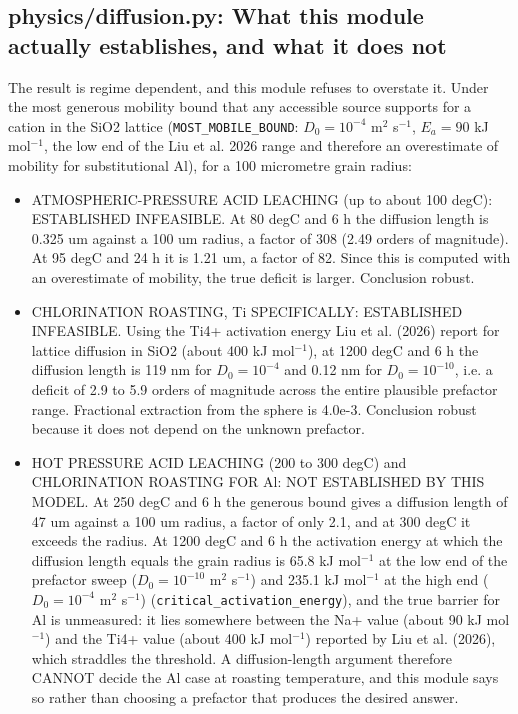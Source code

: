 \documentclass[10pt,a4paper,twoside]{report}
\begin{document}
\subsection{physics/diffusion.py: What this module actually establishes, and what it does not}

The result is regime dependent, and this module refuses to overstate it. Under the most generous mobility bound that any accessible source supports for a cation in the SiO2 lattice (\texttt{MOST\_MOBILE\_BOUND}: $D_0 = 10^{-4}$ m$^{2}$ s$^{-1}$, $E_a = 90$ kJ mol$^{-1}$, the low end of the Liu et al. 2026 range and therefore an overestimate of mobility for substitutional Al), for a 100 micrometre grain radius:

\begin{itemize}
\item ATMOSPHERIC-PRESSURE ACID LEACHING (up to about 100 degC): ESTABLISHED INFEASIBLE. At 80 degC and 6 h the diffusion length is 0.325 um against a 100 um radius, a factor of 308 (2.49 orders of magnitude). At 95 degC and 24 h it is 1.21 um, a factor of 82. Since this is computed with an overestimate of mobility, the true deficit is larger. Conclusion robust.
\item CHLORINATION ROASTING, Ti SPECIFICALLY: ESTABLISHED INFEASIBLE. Using the Ti4+ activation energy Liu et al. (2026) report for lattice diffusion in SiO2 (about 400 kJ mol$^{-1}$), at 1200 degC and 6 h the diffusion length is 119 nm for $D_0 = 10^{-4}$ and 0.12 nm for $D_0 = 10^{-10}$, i.e. a deficit of 2.9 to 5.9 orders of magnitude across the entire plausible prefactor range. Fractional extraction from the sphere is 4.0e-3. Conclusion robust because it does not depend on the unknown prefactor.
\item HOT PRESSURE ACID LEACHING (200 to 300 degC) and CHLORINATION ROASTING FOR Al: NOT ESTABLISHED BY THIS MODEL. At 250 degC and 6 h the generous bound gives a diffusion length of 47 um against a 100 um radius, a factor of only 2.1, and at 300 degC it exceeds the radius. At 1200 degC and 6 h the activation energy at which the diffusion length equals the grain radius is 65.8 kJ mol$^{-1}$ at the low end of the prefactor sweep ($D_0 = 10^{-10}$ m$^{2}$ s$^{-1}$) and 235.1 kJ mol$^{-1}$ at the high end ($D_0 = 10^{-4}$ m$^{2}$ s$^{-1}$) (\texttt{critical\_activation\_energy}), and the true barrier for Al is unmeasured: it lies somewhere between the Na+ value (about 90 kJ mol$^{-1}$) and the Ti4+ value (about 400 kJ mol$^{-1}$) reported by Liu et al. (2026), which straddles the threshold. A diffusion-length argument therefore CANNOT decide the Al case at roasting temperature, and this module says so rather than choosing a prefactor that produces the desired answer.
\end{itemize}
\end{document}
